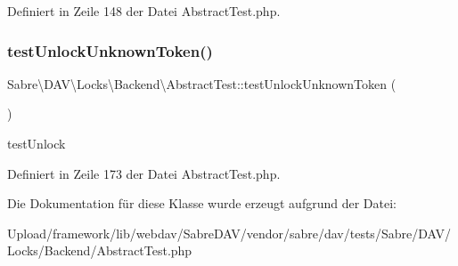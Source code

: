 Definiert in Zeile 148 der Datei Abstract\+Test.\+php.

\mbox{\label{class_sabre_1_1_d_a_v_1_1_locks_1_1_backend_1_1_abstract_test_a835178058670ffbae40e7b2b88e6946d}} 
\subsubsection{\texorpdfstring{test\+Unlock\+Unknown\+Token()}{testUnlockUnknownToken()}}
{\footnotesize\ttfamily Sabre\textbackslash{}\+D\+A\+V\textbackslash{}\+Locks\textbackslash{}\+Backend\textbackslash{}\+Abstract\+Test\+::test\+Unlock\+Unknown\+Token (\begin{DoxyParamCaption}{ }\end{DoxyParamCaption})}

test\+Unlock 

Definiert in Zeile 173 der Datei Abstract\+Test.\+php.



Die Dokumentation für diese Klasse wurde erzeugt aufgrund der Datei\+:\begin{DoxyCompactItemize}
\item 
Upload/framework/lib/webdav/\+Sabre\+D\+A\+V/vendor/sabre/dav/tests/\+Sabre/\+D\+A\+V/\+Locks/\+Backend/Abstract\+Test.\+php\end{DoxyCompactItemize}
